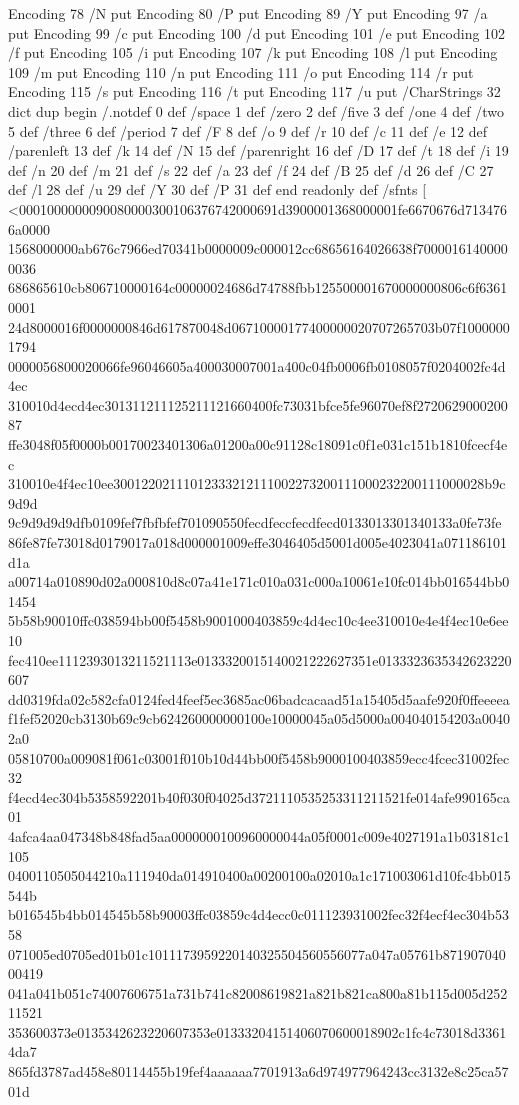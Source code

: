 Encoding 78 /N put
Encoding 80 /P put
Encoding 89 /Y put
Encoding 97 /a put
Encoding 99 /c put
Encoding 100 /d put
Encoding 101 /e put
Encoding 102 /f put
Encoding 105 /i put
Encoding 107 /k put
Encoding 108 /l put
Encoding 109 /m put
Encoding 110 /n put
Encoding 111 /o put
Encoding 114 /r put
Encoding 115 /s put
Encoding 116 /t put
Encoding 117 /u put
/CharStrings 32 dict dup begin
/.notdef 0 def
/space 1 def
/zero 2 def
/five 3 def
/one 4 def
/two 5 def
/three 6 def
/period 7 def
/F 8 def
/o 9 def
/r 10 def
/c 11 def
/e 12 def
/parenleft 13 def
/k 14 def
/N 15 def
/parenright 16 def
/D 17 def
/t 18 def
/i 19 def
/n 20 def
/m 21 def
/s 22 def
/a 23 def
/f 24 def
/B 25 def
/d 26 def
/C 27 def
/l 28 def
/u 29 def
/Y 30 def
/P 31 def
end readonly def
/sfnts [
<0001000000090080000300106376742000691d3900001368000001fe6670676d7134766a0000
1568000000ab676c7966ed70341b0000009c000012cc68656164026638f70000161400000036
686865610cb806710000164c00000024686d74788fbb125500001670000000806c6f63610001
24d8000016f0000000846d617870048d06710000177400000020707265703b07f10000001794
0000056800020066fe96046605a400030007001a400c04fb0006fb0108057f0204002fc4d4ec
310010d4ecd4ec301311211125211121660400fc73031bfce5fe96070ef8f272062900020087
ffe3048f05f0000b00170023401306a01200a00c91128c18091c0f1e031c151b1810fcecf4ec
310010e4f4ec10ee30012202111012333212111002273200111000232200111000028b9c9d9d
9c9d9d9d9dfb0109fef7fbfbfef701090550fecdfeccfecdfecd0133013301340133a0fe73fe
86fe87fe73018d0179017a018d000001009effe3046405d5001d005e4023041a071186101d1a
a00714a010890d02a000810d8c07a41e171c010a031c000a10061e10fc014bb016544bb01454
5b58b90010ffc038594bb00f5458b9001000403859c4d4ec10c4ee310010e4e4f4ec10e6ee10
fec410ee1112393013211521113e0133320015140021222627351e0133323635342623220607
dd0319fda02c582cfa0124fed4feef5ec3685ac06badcacaad51a15405d5aafe920f0ffeeeea
f1fef52020cb3130b69c9cb624260000000100e10000045a05d5000a004040154203a00402a0
05810700a009081f061c03001f010b10d44bb00f5458b9000100403859ecc4fcec31002fec32
f4ecd4ec304b5358592201b40f030f04025d3721110535253311211521fe014afe990165ca01
4afca4aa047348b848fad5aa0000000100960000044a05f0001c009e4027191a1b03181c1105
0400110505044210a111940da014910400a00200100a02010a1c171003061d10fc4bb015544b
b016545b4bb014545b58b90003ffc03859c4d4ecc0c011123931002fec32f4ecf4ec304b5358
071005ed0705ed01b01c1011173959220140325504560556077a047a05761b87190704000419
041a041b051c74007606751a731b741c82008619821a821b821ca800a81b115d005d25211521
353600373e0135342623220607353e01333204151406070600018902c1fc4c73018d33614da7
865fd3787ad458e80114455b19fef4aaaaaa7701913a6d974977964243cc3132e8c25ca5701d
